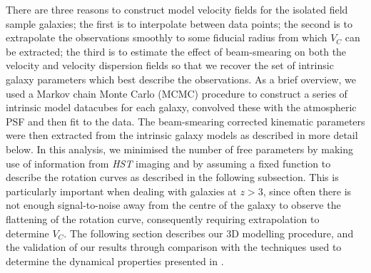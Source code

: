 \documentclass[fleqn,usenatbib]{mnras}
\begin{document}
There are three reasons to construct model velocity fields for the isolated field sample galaxies; the first is to interpolate between data points; the second is to extrapolate the observations smoothly to some fiducial radius from which $V_{C}$ can be extracted; the third is to estimate the effect of beam-smearing on both the velocity and velocity dispersion fields so that we recover the set of intrinsic galaxy parameters which best describe the observations.
As a brief overview, we used a Markov chain Monte Carlo (MCMC) procedure to construct a series of intrinsic model datacubes for each galaxy, convolved these with the atmospheric PSF and then fit to the data.
The beam-smearing corrected kinematic parameters were then extracted from the intrinsic galaxy models as described in more detail below.
In this analysis, we minimised the number of free parameters by making use of information from {\em HST} imaging and by assuming a fixed function to describe the rotation curves as described in the following subsection.    
This is particularly important when dealing with galaxies at $z > 3$, since often there is not enough signal-to-noise away from the centre of the galaxy to observe the flattening of the rotation curve, consequently requiring extrapolation to determine $V_{C}$.  
The following section describes our 3D modelling procedure, and the validation of our results through comparison with the techniques used to determine the dynamical properties presented in \cite{Harrison2017}.
\end{document}

